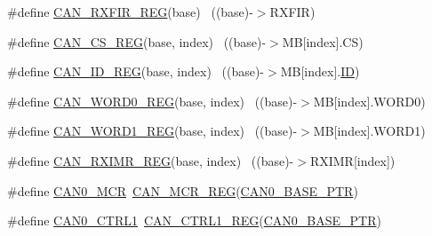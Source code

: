 \begin{DoxyCompactItemize}
\#define \hyperlink{group___c_a_n___register___accessor___macros_ga87e42ff030ce54ff9e1a0c09c05ad4de}{C\+A\+N\+\_\+\+R\+X\+F\+I\+R\+\_\+\+R\+EG}(base)                                        ~((base)-\/$>$R\+X\+F\+IR)
\item 
\#define \hyperlink{group___c_a_n___register___accessor___macros_gac99a637d119cf05e14250a1465275522}{C\+A\+N\+\_\+\+C\+S\+\_\+\+R\+EG}(base,  index)                                  ~((base)-\/$>$MB\mbox{[}index\mbox{]}.CS)
\item 
\#define \hyperlink{group___c_a_n___register___accessor___macros_ga081389bb65f5ba1945fa2984d057044e}{C\+A\+N\+\_\+\+I\+D\+\_\+\+R\+EG}(base,  index)                                  ~((base)-\/$>$MB\mbox{[}index\mbox{]}.\hyperlink{samr21__xpro_200std__low__power__mode_200std__low__power__mode_8c_a77ceac8d6af195fe72f95f6afd87c45e}{ID})
\item 
\#define \hyperlink{group___c_a_n___register___accessor___macros_gab486ab7c313c1c3ab3ea1d146a4e4597}{C\+A\+N\+\_\+\+W\+O\+R\+D0\+\_\+\+R\+EG}(base,  index)                            ~((base)-\/$>$MB\mbox{[}index\mbox{]}.W\+O\+R\+D0)
\item 
\#define \hyperlink{group___c_a_n___register___accessor___macros_gabea0fd7f957d3c4e7770f1670aff54dc}{C\+A\+N\+\_\+\+W\+O\+R\+D1\+\_\+\+R\+EG}(base,  index)                            ~((base)-\/$>$MB\mbox{[}index\mbox{]}.W\+O\+R\+D1)
\item 
\#define \hyperlink{group___c_a_n___register___accessor___macros_gabcdb674583aff011e9cae0837f6abd5a}{C\+A\+N\+\_\+\+R\+X\+I\+M\+R\+\_\+\+R\+EG}(base,  index)                            ~((base)-\/$>$R\+X\+I\+MR\mbox{[}index\mbox{]})
\item 
\#define \hyperlink{group___c_a_n___register___accessor___macros_ga300565478bb512e7ca03af0ecf31137a}{C\+A\+N0\+\_\+\+M\+CR}~\hyperlink{group___c_a_n___register___accessor___macros_ga266f3270836a0e2113e665b27e8469c3}{C\+A\+N\+\_\+\+M\+C\+R\+\_\+\+R\+EG}(\hyperlink{group___c_a_n___peripheral_ga1ee8f499e10af9b8e3132e0168e519b9}{C\+A\+N0\+\_\+\+B\+A\+S\+E\+\_\+\+P\+TR})
\item 
\#define \hyperlink{group___c_a_n___register___accessor___macros_gacd647d438a70b740aca411d35aee6de2}{C\+A\+N0\+\_\+\+C\+T\+R\+L1}~\hyperlink{group___c_a_n___register___accessor___macros_gacb8258cf058657f2e55abcfb40b99344}{C\+A\+N\+\_\+\+C\+T\+R\+L1\+\_\+\+R\+EG}(\hyperlink{group___c_a_n___peripheral_ga1ee8f499e10af9b8e3132e0168e519b9}{C\+A\+N0\+\_\+\+B\+A\+S\+E\+\_\+\+P\+TR})
\item 

\end{DoxyCompactItemize}
